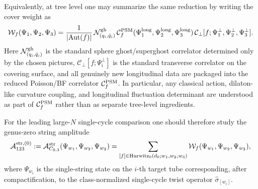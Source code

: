 \documentclass[11pt]{article}
\newcommand{\mc}[1]{\mathcal{#1}}
\begin{document}
Equivalently, at tree level one may summarize the same reduction by writing the cover weight as
\begin{equation}\label{eq:cover-weight-factorization}
\mc W_f(\Psi_1,\Psi_2,\Psi_3)
=
\frac{1}{|\mathrm{Aut}(f)|}\,
\mc N^{\rm gh}_{(q_i,\bar q_i)}\,
\mc C_f^{\rm PSM}(\Psi_1^{\rm long},\Psi_2^{\rm long},\Psi_3^{\rm long})\,
\mc C_\perp[f;\Psi_1^\perp,\Psi_2^\perp,\Psi_3^\perp].
\end{equation}
Here $\mc N^{\rm gh}_{(q_i,\bar q_i)}$ is the standard sphere ghost/superghost correlator determined only by the chosen pictures, $\mc C_\perp[f;\Psi_i^\perp]$ is the standard transverse correlator on the covering surface, and all genuinely new longitudinal data are packaged into the reduced Poisson/BF correlator $\mc C_f^{\rm PSM}$. In particular, any classical action, dilaton-like curvature coupling, and longitudinal fluctuation determinant are understood as part of $\mc C_f^{\rm PSM}$ rather than as separate tree-level ingredients.

For the leading large-$N$ single-cycle comparison one should therefore study the genus-zero string amplitude
\begin{equation}\label{eq:tree-level-string-three-point}
\mc A^{\rm str,(0)}_{123}
:=
\mc A^{\rm str}_{C_{0,3}}(\Psi_{w_1},\Psi_{w_2},\Psi_{w_3})
=
\sum_{[f]\in \mathrm{Hurwitz}_0(d_0;w_1,w_2,w_3)}
\mc W_f(\Psi_{w_1},\Psi_{w_2},\Psi_{w_3}),
\end{equation}
where $\Psi_{w_i}$ is the single-string state on the $i$-th target tube corresponding, after compactification, to the class-normalized single-cycle twist operator $\widehat{\sigma}_{[w_i]}$.
\end{document}
